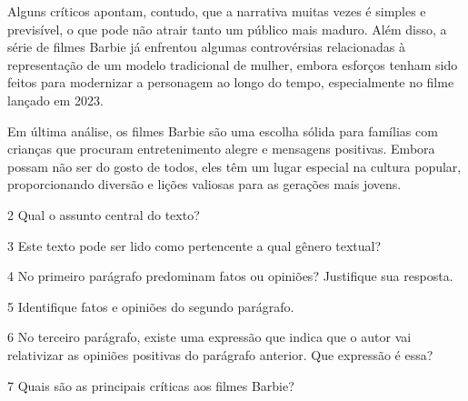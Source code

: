 \begin{myquote}
Alguns críticos apontam, contudo, que a narrativa muitas vezes é simples e
previsível, o que pode não atrair tanto um público mais maduro. Além disso, a
série de filmes Barbie já enfrentou algumas controvérsias relacionadas à
representação de um modelo tradicional de mulher, embora esforços tenham sido feitos
para modernizar a personagem ao longo do tempo, especialmente no filme 
lançado em 2023.

Em última análise, os filmes Barbie são uma escolha sólida para famílias com
crianças que procuram entretenimento alegre e mensagens positivas. Embora
possam não ser do gosto de todos, eles têm um lugar especial na cultura
popular, proporcionando diversão e lições valiosas para as gerações mais
jovens.


\end{myquote}

\num{2} Qual o assunto central do texto?


\num{3} Este texto pode ser lido como pertencente a qual gênero textual?


\num{4} No primeiro parágrafo predominam fatos ou opiniões? Justifique sua resposta.


\num{5} Identifique fatos e opiniões do segundo parágrafo.


\num{6} No terceiro parágrafo, existe uma expressão que indica que o autor vai
relativizar as opiniões positivas do parágrafo anterior. Que expressão é essa? 


\num{7} Quais são as principais críticas aos filmes Barbie? 


